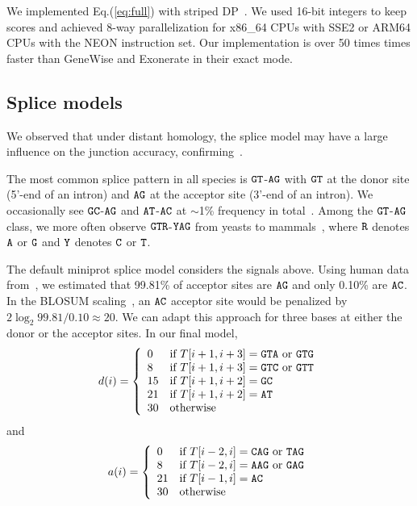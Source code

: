 \documentclass{bioinfo}
\begin{document}
\begin{methods}
We implemented Eq.(\ref{eq:full}) with striped DP~\citep{Farrar:2007hs}.
We used 16-bit integers to keep scores and achieved 8-way parallelization
for x86\_64 CPUs with SSE2 or ARM64 CPUs with the NEON instruction set.
Our implementation is over 50 times times faster than GeneWise and Exonerate in
their exact mode.

\subsection{Splice models}

We observed that under distant homology, the splice model may have a large
influence on the junction accuracy, confirming~\citet{Iwata:2012aa}.

The most common splice pattern in all species is ${\tt GT}$-${\tt AG}$ with
${\tt GT}$ at the donor site (5'-end of an intron) and ${\tt AG}$ at the
acceptor site (3'-end of an intron). We occasionally see ${\tt GC}$-${\tt AG}$
and ${\tt AT}$-${\tt AC}$ at $\sim$1\% frequency in total~\citep{Sheth:2006vg}.
Among the ${\tt GT}$-${\tt AG}$ class, we more often observe ${\tt GTR}$-${\tt
YAG}$ from yeasts to mammals~\citep{Irimia:2008aa}, where ${\tt R}$ denotes
${\tt A}$ or ${\tt G}$ and ${\tt Y}$ denotes ${\tt C}$ or ${\tt T}$.

The default miniprot splice model considers the signals above. Using human data
from~\citet{Sibley:2016vh}, we estimated that 99.81\% of acceptor sites are ${\tt
AG}$ and only 0.10\% are ${\tt AC}$. In the BLOSUM
scaling~\citep{Henikoff:1992tk}, an ${\tt AC}$ acceptor site would be penalized
by $2\log_2 99.81/0.10\approx 20$. We can adapt this approach for three bases at
either the donor or the acceptor sites. In our final model,
$$
d(i)=\left\{\begin{array}{ll}
0 & \mbox{if $T[i+1,i+3]={\tt GTA}$ or ${\tt GTG}$}\\
8 & \mbox{if $T[i+1,i+3]={\tt GTC}$ or ${\tt GTT}$}\\
15 & \mbox{if $T[i+1,i+2]={\tt GC}$}\\
21 & \mbox{if $T[i+1,i+2]={\tt AT}$}\\
30 & \mbox{otherwise}\\
\end{array}\right.
$$
and
$$
a(i)=\left\{\begin{array}{ll}
0 & \mbox{if $T[i-2,i]={\tt CAG}$ or ${\tt TAG}$}\\
8 & \mbox{if $T[i-2,i]={\tt AAG}$ or ${\tt GAG}$}\\
21 & \mbox{if $T[i-1,i]={\tt AC}$}\\
30 & \mbox{otherwise}\\
\end{array}\right.
$$


\end{methods}
\end{document}
